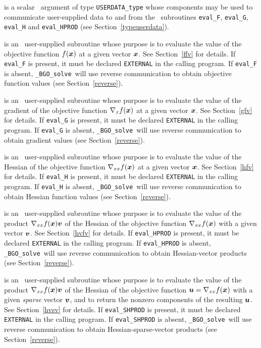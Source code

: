 \documentclass{galahad}
\newcommand{\packagename}{BGO}
\newcommand{\fullpackagename}{\libraryname\_\packagename}
\newcommand{\solver}{{\tt \fullpackagename\_solve}}
\begin{document}
\begin{description}
 is a scalar \intentinout\ argument of type
{\tt USERDATA\_type} whose components may be used
to communicate user-supplied data to and from the
\optional\ subroutines
{\tt eval\_F}, {\tt eval\_G},
{\tt eval\_H} and {\tt eval\_HPROD}
(see Section~\ref{typeuserdata}).

 is an \optional\
user-supplied subroutine whose purpose is to evaluate the value of the
objective function $f({\bm{x}})$ at a given vector ${\bm{x}}$.
See Section~\ref{ffv} for details.
If {\tt eval\_F} is present,
it must be declared {\tt EXTERNAL} in the calling program.
If {\tt eval\_F} is absent, \solver\ will use reverse communication to
obtain objective function values (see Section~\ref{reverse}).

 is an \optional\
user-supplied subroutine whose purpose is to evaluate the value of the
gradient of the objective function $\nabla_x f({\bm{x}})$ at a given vector ${\bm{x}}$.
See Section~\ref{gfv} for details.
If {\tt eval\_G} is present,
it must be declared {\tt EXTERNAL} in the calling program.
If {\tt eval\_G} is absent, \solver\ will use reverse communication to
obtain gradient values (see Section~\ref{reverse}).

 is an \optional\
user-supplied subroutine whose purpose is to evaluate the value of the
Hessian of the objective function $\nabla_{xx} f({\bm{x}})$ at a given vector ${\bm{x}}$.
See Section~\ref{hfv} for details.
If {\tt eval\_H} is present,
it must be declared {\tt EXTERNAL} in the calling program.
If {\tt eval\_H} is absent, \solver\ will use reverse communication to
obtain Hessian function values (see Section~\ref{reverse}).

\itt{eval\_HPROD} is an \optional\
user-supplied subroutine whose purpose is to evaluate the value of the
product $\nabla_{xx} f({\bm{x}}){\bm{v}}$ of the Hessian of the objective function
$\nabla_{xx} f({\bm{x}})$  with a given vector ${\bm{v}}$.
See Section~\ref{hvfv} for details.
If {\tt eval\_HPROD} is present,
it must be declared {\tt EXTERNAL} in the calling program.
If {\tt eval\_HPROD} is absent, \solver\ will use reverse communication to
obtain Hessian-vector products (see Section~\ref{reverse}).

\itt{eval\_SHPROD} is an \optional\
user-supplied subroutine whose purpose is to evaluate the value of the
product $\nabla_{xx} f({\bm{x}}){\bm{v}}$ of the Hessian of the objective function
${\bm{u}} = \nabla_{xx} f({\bm{x}})$  with a given {\em sparse} vector ${\bm{v}}$,
and to return the nonzero components of the resulting ${\bm{u}}$.
See Section~\ref{hvsv} for details.
If {\tt eval\_SHPROD} is present,
it must be declared {\tt EXTERNAL} in the calling program.
If {\tt eval\_SHPROD} is absent, \solver\ will use reverse communication to
obtain Hessian-sparse-vector products (see Section~\ref{reverse}).


\end{description}
\end{document}
